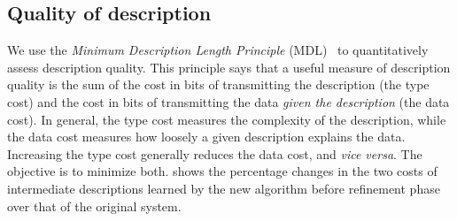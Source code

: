 \subsection{Quality of description}
We use the {\em Minimum Description Length Principle}
(MDL)~\cite{mdlbook} to quantitatively assess description quality.
This principle says that a useful measure of description quality is
the sum of the cost in bits of transmitting the description (the
type cost) and the cost in bits of transmitting the data
\textit{given the description} (the data cost).  In general, the
type cost measures the complexity of the description, while the data
cost measures how loosely a given description explains the data.
Increasing the type cost generally reduces the data cost, and
\textit{vice versa}. The objective is to minimize both.
 shows the
percentage changes in the two costs of intermediate descriptions learned by
the new algorithm before refinement phase over that of the original \learnpads{} system.

